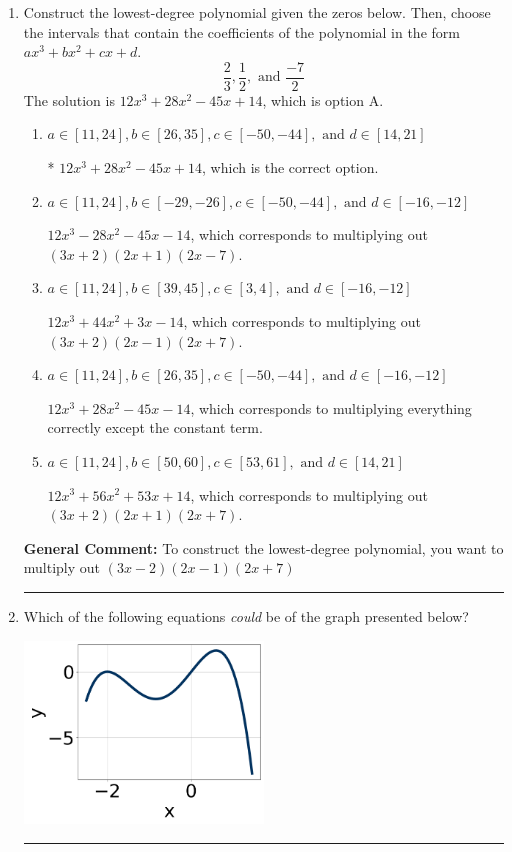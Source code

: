 \documentclass{extbook}[14pt]
\newcommand{\litem}[1]{\item #1

\rule{\textwidth}{0.4pt}}
\begin{document}
\begin{enumerate}\litem{
Construct the lowest-degree polynomial given the zeros below. Then, choose the intervals that contain the coefficients of the polynomial in the form $ax^3+bx^2+cx+d$.
\[ \frac{2}{3}, \frac{1}{2}, \text{ and } \frac{-7}{2} \]The solution is \( 12x^{3} +28 x^{2} -45 x + 14 \), which is option A.\begin{enumerate}[label=\Alph*.]
\item \( a \in [11, 24], b \in [26, 35], c \in [-50, -44], \text{ and } d \in [14, 21] \)

* $12x^{3} +28 x^{2} -45 x + 14$, which is the correct option.
\item \( a \in [11, 24], b \in [-29, -26], c \in [-50, -44], \text{ and } d \in [-16, -12] \)

$12x^{3} -28 x^{2} -45 x -14$, which corresponds to multiplying out $(3x + 2)(2x + 1)(2x -7)$.
\item \( a \in [11, 24], b \in [39, 45], c \in [3, 4], \text{ and } d \in [-16, -12] \)

$12x^{3} +44 x^{2} +3 x -14$, which corresponds to multiplying out $(3x + 2)(2x -1)(2x + 7)$.
\item \( a \in [11, 24], b \in [26, 35], c \in [-50, -44], \text{ and } d \in [-16, -12] \)

$12x^{3} +28 x^{2} -45 x -14$, which corresponds to multiplying everything correctly except the constant term.
\item \( a \in [11, 24], b \in [50, 60], c \in [53, 61], \text{ and } d \in [14, 21] \)

$12x^{3} +56 x^{2} +53 x + 14$, which corresponds to multiplying out $(3x + 2)(2x + 1)(2x + 7)$.
\end{enumerate}

\textbf{General Comment:} To construct the lowest-degree polynomial, you want to multiply out $(3x -2)(2x -1)(2x + 7)$
}
\litem{
Which of the following equations \textit{could} be of the graph presented below?

\begin{center}
    \includegraphics[width=0.5\textwidth]{../Figures/polyGraphToFunctionC.png}
\end{center}


}
\end{enumerate}
\end{document}
